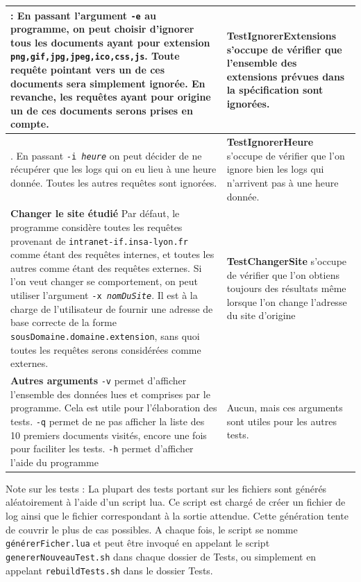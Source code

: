 \documentclass[11pt]{article}
\begin{document}
\begin{tabularx}{\linewidth}{|>{\setlength{\hsize}{.5\hsize}\raggedright\arraybackslash}X|>{\setlength{\hsize}{.5\hsize}\raggedright\arraybackslash}X|}
 \hline
 {\bf Exclusion de certaines extensions} : En passant l'argument \texttt{-e} au programme, on peut choisir d'ignorer tous les documents ayant pour extension \texttt{png,gif,jpg,jpeg,ico,css,js}. Toute requête pointant vers un de ces documents sera simplement ignorée. En revanche, les requêtes ayant pour origine un de ces documents serons prises en compte. & \textbf{TestIgnorerExtensions} s'occupe de vérifier que l'ensemble des extensions prévues dans la spécification sont ignorées. \\
  \hline
  {\bf Créneau Horaire}. En passant \texttt{-i \emph{heure}} on peut décider de ne récupérer que les logs qui on eu lieu à une heure donnée. Toutes les autres requêtes sont ignorées.
  & \textbf{TestIgnorerHeure} s'occupe de vérifier que l'on ignore bien les logs qui n'arrivent pas à une heure donnée.\\
  \hline
  {\bf Changer le site étudié} Par défaut, le programme considère toutes les requêtes provenant de \texttt{intranet-if.insa-lyon.fr} comme étant des requêtes internes, et toutes les autres comme étant des requêtes externes. Si l'on veut changer se comportement, on peut utiliser l'argument \texttt{-x \emph{nomDuSite}}. Il est à la charge de l'utilisateur de fournir une adresse de base correcte de la forme \texttt{sousDomaine.domaine.extension}, sans quoi toutes les requêtes serons considérées comme externes. 
  & {\bf TestChangerSite} s'occupe de vérifier que l'on obtiens toujours des résultats même lorsque l'on change l'adresse du site d'origine\\
  \hline
  {\bf Autres arguments} \newline
   \texttt{-v} permet d'afficher l'ensemble des données lues et comprises par le programme. Cela est utile pour l'élaboration des tests. \newline
   \texttt{-q} permet de ne pas afficher la liste des 10 premiers documents visités, encore une fois pour faciliter les tests. \newline
   \texttt{-h} permet d'afficher l'aide du programme
  & Aucun, mais ces arguments sont utiles pour les autres tests. \\
  \hline
\end{tabularx}

Note sur les tests : La plupart des tests portant sur les fichiers sont générés aléatoirement à l'aide d'un script lua. Ce script est chargé de créer un fichier de log ainsi que le fichier correspondant à la sortie attendue. Cette génération tente de couvrir le plus de cas possibles. A chaque fois, le script se nomme {\tt générerFicher.lua} et peut être invoqué en appelant le script {\tt genererNouveauTest.sh} dans chaque dossier de Tests, ou simplement en appelant {\tt rebuildTests.sh} dans le dossier Tests.
\end{document}
